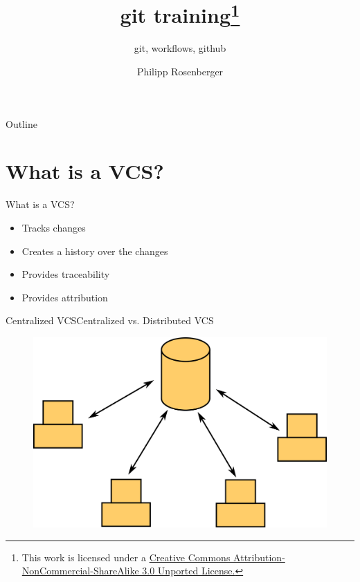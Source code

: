 \documentclass[aspectratio=169]{beamer}
\title {git training\footnote{This work is licensed under a \href{http://creativecommons.org/licenses/by-nc-sa/3.0/}{Creative Commons Attribution-NonCommercial-ShareAlike 3.0 Unported License.}}}
\subtitle{git, workflows, github}
\author{Philipp Rosenberger}
\institute{KUNBUS GmbH}
\begin{document}
\begin{frame}
\titlepage
\end{frame}

\begin{frame}{Outline}
    \tableofcontents
\end{frame}

\section{What is a VCS?}
\begin{frame}{What is a VCS?}
\begin{itemize}
    \item Tracks changes
    \item Creates a history over the changes
    \item Provides traceability
    \item Provides attribution
\end{itemize}
\end{frame}

\begin{frame}{Centralized VCS}{Centralized vs. Distributed VCS}
\begin{figure}
    \centering
    \includegraphics[width=\textwidth,height=0.6\textheight,keepaspectratio]{01_centralized_vcs}
\end{figure}
\end{frame}
\end{document}
